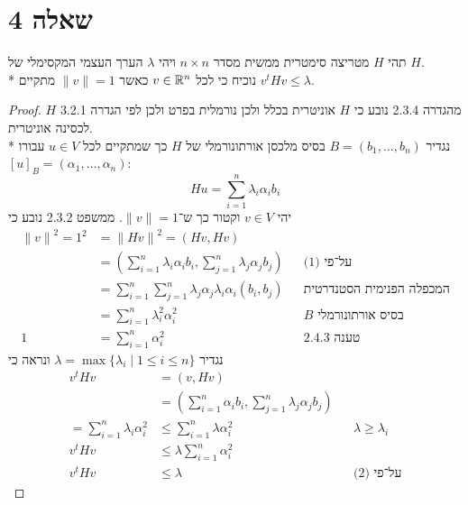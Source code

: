 \section{שאלה 4}
תהי $H$ מטריצה סימטרית ממשית מסדר $n \times n$ ויהי $\lambda$ הערך העצמי המקסימלי של $H$. \\*
נוכיח כי לכל $v \in \mathbb{R}^n$ כאשר $\lVert v \rVert = 1$ מתקיים $v^t H v \le \lambda$.
\begin{proof}
	מהגדרה 2.3.4 נובע כי $H$ אוניטרית בכלל ולכן נורמלית בפרט ולכן לפי הגדרה 3.2.1 $H$ לכסינה אוניטרית. \\*
	נגדיר $B = (b_1, \hdots, b_n)$ בסיס מלכסן אורתונורמלי של $H$ כך שמתקיים לכל $u \in V$ עבורו ${[u]}_B = (\alpha_1, \hdots, \alpha_n)$:
	\[
		H u = \sum_{i = 1}^n \lambda_i \alpha_i b_i \tag{1}
	\]
	יהי $v \in V$ וקטור כך ש־$\lVert v \rVert = 1$. ממשפט 2.3.2 נובע כי
	\begin{align*}
		{\lVert v \rVert}^2 = 1^2
		& = {\lVert H v \rVert}^2 = (H v, H v) \\
		& = (\sum_{i = 1}^n \lambda_i \alpha_i b_i, \sum_{j = 1}^n \lambda_j \alpha_j b_j) && \text{על־פי (1)} \\
		& = \sum_{i = 1}^n \sum_{j = 1}^n \lambda_j \alpha_j \lambda_i \alpha_i (b_i, b_j) && \text{המכפלה הפנימית הסטנדרטית} \\
		& = \sum_{i = 1}^n \lambda_i^2 \alpha_i^2 && \text{$B$ בסיס אורתונורמלי} \\
		1 & = \sum_{i = 1}^n \alpha_i^2 && \text{טענה 2.4.3} \tag{2}
	\end{align*}
	נגדיר $\lambda = \max\{ \lambda_i \mid 1 \le i \le n \}$ ונראה כי
	\begin{align*}
		v^t H v & = (v, H v) \\
				& = (\sum_{i = 1}^n \alpha_i b_i, \sum_{j = 1}^n \lambda_j \alpha_j b_j) \\
		= \sum_{i = 1}^n \lambda_i \alpha_i^2 & \le \sum_{i = 1}^n \lambda \alpha_i^2 && \lambda \ge \lambda_i \\
		v^t H v & \le \lambda \sum_{i = 1}^n \alpha_i^2 \\
		v^t H v & \le \lambda && \text{על־פי (2)}
	\end{align*}
\end{proof}

